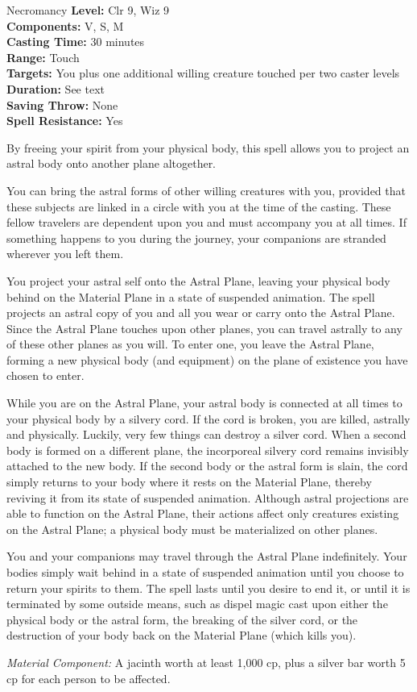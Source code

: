 {Necromancy}
{
	\textbf{Level:}
	Clr 9, Wiz 9\\
	\textbf{Components:}
	V, S, M\\
	\textbf{Casting Time:}
	30 minutes\\
	\textbf{Range:}
	Touch\\
	\textbf{Targets:}
	You plus one additional willing creature touched per two caster levels\\
	\textbf{Duration:}
	See text\\
	\textbf{Saving Throw:}
	None\\
	\textbf{Spell Resistance:}
	Yes\\
}
{
	By freeing your spirit from your physical body, this spell allows you to project an astral body onto another plane altogether.

	You can bring the astral forms of other willing creatures with you, provided that these subjects are linked in a circle with you at the time of the casting. These fellow travelers are dependent upon you and must accompany you at all times. If something happens to you during the journey, your companions are stranded wherever you left them.

	You project your astral self onto the Astral Plane, leaving your physical body behind on the Material Plane in a state of suspended animation. The spell projects an astral copy of you and all you wear or carry onto the Astral Plane. Since the Astral Plane touches upon other planes, you can travel astrally to any of these other planes as you will. To enter one, you leave the Astral Plane, forming a new physical body (and equipment) on the plane of existence you have chosen to enter.

	While you are on the Astral Plane, your astral body is connected at all times to your physical body by a silvery cord. If the cord is broken, you are killed, astrally and physically. Luckily, very few things can destroy a silver cord. When a second body is formed on a different plane, the incorporeal silvery cord remains invisibly attached to the new body. If the second body or the astral form is slain, the cord simply returns to your body where it rests on the Material Plane, thereby reviving it from its state of suspended animation. Although astral projections are able to function on the Astral Plane, their actions affect only creatures existing on the Astral Plane; a physical body must be materialized on other planes.

	You and your companions may travel through the Astral Plane indefinitely. Your bodies simply wait behind in a state of suspended animation until you choose to return your spirits to them. The spell lasts until you desire to end it, or until it is terminated by some outside means, such as dispel magic cast upon either the physical body or the astral form, the breaking of the silver cord, or the destruction of your body back on the Material Plane (which kills you).

	\textit{Material Component:}
	A jacinth worth at least 1,000 cp, plus a silver bar worth 5 cp for each person to be affected.

}
